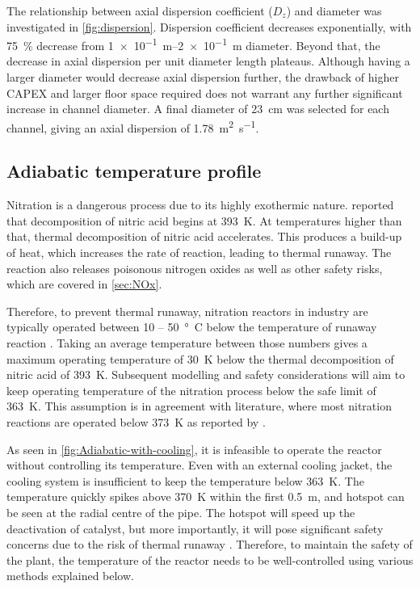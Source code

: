 The relationship between axial dispersion coefficient ($D_z$) and diameter was investigated in \cref{fig:dispersion}. Dispersion coefficient decreases exponentially, with \SI{75}{\%} decrease from \SIrange{1e-1}{2e-1}{\m} diameter. Beyond that, the decrease in axial dispersion per unit diameter length plateaus. Although having a larger diameter would decrease axial dispersion further, the drawback of higher CAPEX and larger floor space required does not warrant any further significant increase in channel diameter. A final diameter of \SI{23}{\cm} was selected for each channel, giving an axial dispersion of \SI{1.78}{\metre \squared \per \second}. 

\subsection{Adiabatic temperature profile}

\label{sec:adiabatic}

Nitration is a dangerous process due to its highly exothermic nature. \textcite{di_miceli_raimondi_safety_2015} reported that decomposition of nitric acid begins at \SI{393}{\K}. At temperatures higher than that, thermal decomposition of nitric acid accelerates. This produces a build-up of heat, which increases the rate of reaction, leading to thermal runaway. The reaction also releases poisonous nitrogen oxides as well as other safety risks, which are covered in \cref{sec:NOx}. 

Therefore, to prevent thermal runaway, nitration reactors in industry are typically operated between \si{10} – \SI{50}{°C} below the temperature of runaway reaction \cite{noauthor_lees_2012}. Taking an average temperature between those numbers gives a maximum operating temperature of \SI{30}{\K} below the thermal decomposition of nitric acid of \SI{393}{\K}. Subsequent modelling and safety considerations will aim to keep operating temperature of the nitration process below the safe limit of \SI{363}{\K}. This assumption is in agreement with literature, where most nitration reactions are operated below \SI{373}{\K} as reported by \textcite{chen_experimental_1998}.

As seen in \cref{fig:Adiabatic-with-cooling}, it is infeasible to operate the reactor without controlling its temperature. Even with an external cooling jacket, the cooling system is insufficient to keep the temperature below \SI{363}{\K}. The temperature quickly spikes above \SI{370}{\K} within the first \SI{0.5}{\m}, and hotspot can be seen at the radial centre of the pipe. The hotspot will speed up the deactivation of catalyst, but more importantly, it will pose significant safety concerns due to the risk of thermal runaway \cite{nguyen_flow_1994}. Therefore, to maintain the safety of the plant, the temperature of the reactor needs to be well-controlled using various methods explained below.

